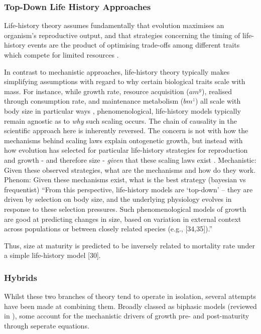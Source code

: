 \documentclass[a4paper]{article} %
\begin{document}
        \subsubsection{Top-Down Life History Approaches}
        Life-history theory assumes fundamentally that evolution maximises an organism's reproductive output, and that strategies concerning the timing of life-history events are the product of optimising trade-offs among different traits which compete for limited resources \autocite{Day1997, Stearns1989, stearns1992evolution}.      

        In contrast to mechanistic approaches, life-history theory typically makes simplifying assumptions with regard to why certain biological traits scale with mass. \autocite{Day1997, Kozowski1987-indeterminate} For instance, while growth rate, resource acquisition ($am^y$), realised through consumption rate, and maintenance metabolism ($bm^z$) all scale with body size in particular ways \autocite{peters1983,Werner1988,brown2000-scaling-book}, phenomenological, life-history models typically remain agnostic as to \textit{why} such scaling occurs. The chain of causality in the scientific approach here is inherently reversed. The concern is not with how the mechanisms behind scaling laws explain ontogenetic growth, but instead with how evolution has selected for particular life-history strategies for reproduction and growth - and therefore size - \textit{given} that these scaling laws exist \autocite{Danko2017}. Mechanistic: Given these observed strategies, what are the mechanisms and how do they work. Phenom: Given these mechanisms exist, what is the best strategy (bayesian vs frequentist) ``From this perspective, life-history models are ‘top-down’ – they are driven by selection on body size, and the underlying physiology evolves in response to these selection pressures. Such phenomenological models of growth are good at predicting changes in size, based on variation in external context across populations or between closely related species (e.g., [34,35]).''
        
        Thus, size at maturity is predicted to be inversely related to mortality rate under a simple life-history model [30].

        \subsubsection{Hybrids}
        Whilst these two branches of theory tend to operate in isolation, several attempts have been made at combining them. Broadly classed as biphasic models (reviewed in \autocite{Wilson2018}), some account for the mechanistic drivers of growth pre- and post-maturity through seperate equations. 
        
\end{document}
